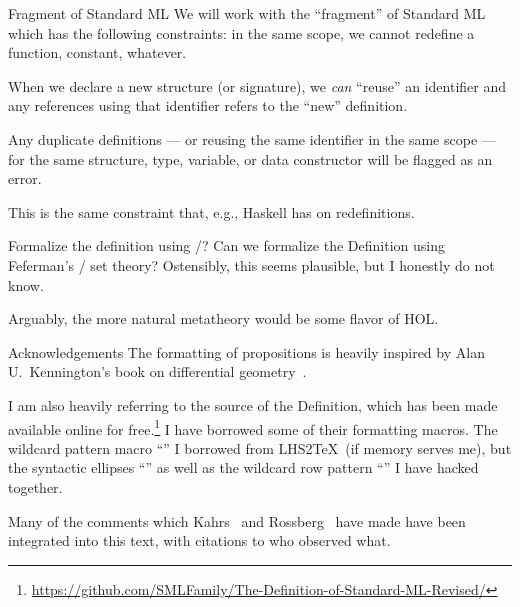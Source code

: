 \begin{deviation}{Fragment of Standard ML}\label{deviation:no-redefinitions}
We will work with the ``fragment'' of Standard ML which has the
following constraints: in the same scope, we cannot redefine a function,
constant, whatever.

When we declare a new structure (or signature), we \emph{can} ``reuse''
an identifier and any references using that identifier refers to the
``new'' definition.

Any duplicate definitions --- or reusing the same identifier in the same
scope --- for the same structure, type, variable, or data constructor
will be flagged as an error.

This is the same constraint that, e.g., Haskell has on redefinitions.
\end{deviation}

\begin{puzzle}{Formalize the definition using /?}
Can we formalize the Definition using Feferman's / set theory?
Ostensibly, this seems plausible, but I honestly do not know.

Arguably, the more natural metatheory would be some flavor of HOL.
\end{puzzle}

\begin{remark}{Acknowledgements}
The formatting of propositions is heavily inspired by Alan
U.\ Kennington's book on differential geometry~\cite{kennington2024dg}.

I am also heavily referring to the source of the Definition,
which has been made available online for free.\footnote{\url{https://github.com/SMLFamily/The-Definition-of-Standard-ML-Revised/}}
I have borrowed some of their formatting macros.
The wildcard pattern macro ``\wildcard'' I borrowed from LHS2\TeX\ (if
memory serves me), but the syntactic ellipses ``\syndots'' as well as
the wildcard row pattern ``\wildcardrow'' I have hacked together.

Many of the comments which Kahrs~\cite{kahrs1993mistakes,kahrs1996addenda}
and Rossberg~\cite{rossberg2018defects} have made have been integrated
into this text, with citations to who observed what.
\end{remark}